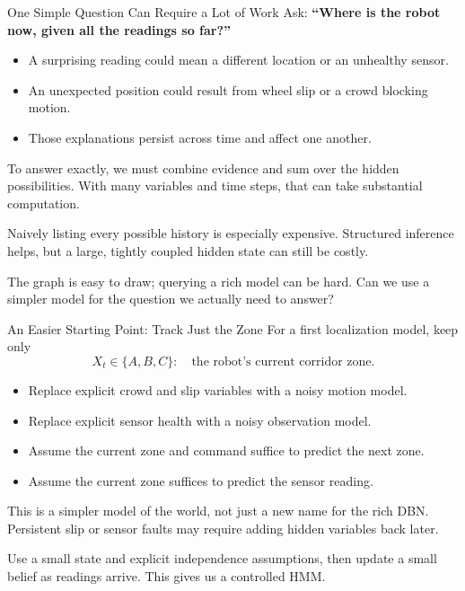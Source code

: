 \documentclass[aspectratio=169,10pt]{beamer}
\begin{document}
\begin{frame}[t]{One Simple Question Can Require a Lot of Work}
  \small
  Ask: \textbf{``Where is the robot now, given all the readings so far?''}

  \begin{itemize}
    \item A surprising reading could mean a different location or an unhealthy sensor.
    \item An unexpected position could result from wheel slip or a crowd blocking motion.
    \item Those explanations persist across time and affect one another.
  \end{itemize}

  To answer exactly, we must combine evidence and sum over the hidden possibilities.
  With many variables and time steps, that can take substantial computation.

  \medskip
  Naively listing every possible history is especially expensive. Structured inference helps, but a large, tightly coupled hidden state can still be costly.

  \begin{keyidea}
    The graph is easy to draw; querying a rich model can be hard. Can we use a simpler model for the question we actually need to answer?
  \end{keyidea}
\end{frame}

\begin{frame}[t]{An Easier Starting Point: Track Just the Zone}
  \small
  For a first localization model, keep only
  \[
    X_t\in\{A,B,C\}:\quad\text{the robot's current corridor zone.}
  \]
  \begin{itemize}
    \item Replace explicit crowd and slip variables with a noisy motion model.
    \item Replace explicit sensor health with a noisy observation model.
    \item Assume the current zone and command suffice to predict the next zone.
    \item Assume the current zone suffices to predict the sensor reading.
  \end{itemize}

  This is a simpler model of the world, not just a new name for the rich DBN.
  Persistent slip or sensor faults may require adding hidden variables back later.

  \begin{keyidea}
    Use a small state and explicit independence assumptions, then update a small belief as readings arrive. This gives us a controlled HMM.
  \end{keyidea}
\end{frame}
\end{document}
